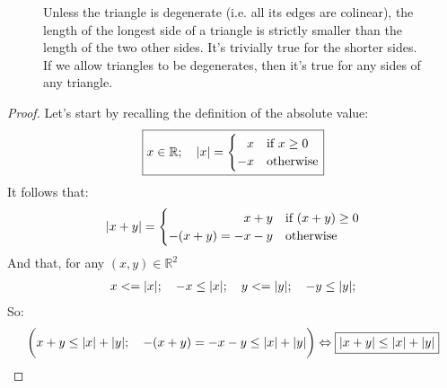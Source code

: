 \documentclass[solutions.tex]{subfiles}
\begin{document}
\begin{figure}[H]
	\centering
	\caption{Unless the triangle is degenerate (i.e. all its
	edges are colinear), the length of the longest side of a triangle is
	strictly smaller than the length of the two other sides. It's trivially
	true for the shorter sides. If we allow triangles to be degenerates,
	then it's true for any sides of any triangle.}
\end{figure}
\begin{proof} Let's start by recalling the definition of the absolute
value:
\begin{equation*} \begin{aligned}
	\boxed{x\in\mathbb{R};\quad \abs{x} =
		\begin{cases}
			\hfill x & \text{if $x \ge 0$} \\
			-x & \text{otherwise}
		\end{cases}}
\end{aligned} \end{equation*}
It follows that:
\begin{equation*} \begin{aligned}
	\abs{x+y} =
		\begin{cases}
			\hfill x+y & \text{if $(x+y) \ge 0$} \\
			-(x+y)=-x-y & \text{otherwise}
		\end{cases}
\end{aligned} \end{equation*}
And that, for any $(x, y)\in\mathbb{R}^2$
\begin{equation*} \begin{aligned}
	x <= \lvert x \rvert;\quad -x \leq \lvert x \rvert;\quad
		y <= \lvert y \rvert;\quad -y \leq \lvert y \rvert;
\end{aligned} \end{equation*}
So:
\begin{equation*} \begin{aligned}
	\biggl(x+y \le \lvert x \rvert+\lvert y \rvert;\quad
	-(x+y) = -x-y \le \lvert x \rvert+\lvert y \rvert\biggr)
	\Leftrightarrow\boxed{\lvert x+y \rvert\le\lvert x \rvert+\lvert y \rvert}
\end{aligned} \end{equation*}
\end{proof}
\end{document}
